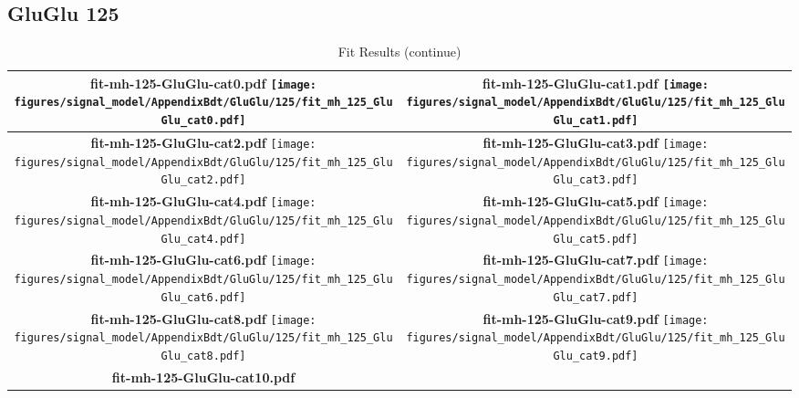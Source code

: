 \subsection{GluGlu 125}
\begin{longtable}{|c|c|}
\caption{Fit Results}
\endfirsthead
\caption{Fit Results (continue)}
\endhead
\hline
\parbox{0.47\textwidth}{
\centering
{\bfseries fit-mh-125-GluGlu-cat0.pdf}
\texttt{[image: figures/signal\_model/AppendixBdt/GluGlu/125/fit\_mh\_125\_GluGlu\_cat0.pdf]}
}
 & \parbox{0.47\textwidth}{
\centering
{\bfseries fit-mh-125-GluGlu-cat1.pdf}
\texttt{[image: figures/signal\_model/AppendixBdt/GluGlu/125/fit\_mh\_125\_GluGlu\_cat1.pdf]}
}
 \\
\hline
\parbox{0.47\textwidth}{
\centering
{\bfseries fit-mh-125-GluGlu-cat2.pdf}
\texttt{[image: figures/signal\_model/AppendixBdt/GluGlu/125/fit\_mh\_125\_GluGlu\_cat2.pdf]}
}
 & \parbox{0.47\textwidth}{
\centering
{\bfseries fit-mh-125-GluGlu-cat3.pdf}
\texttt{[image: figures/signal\_model/AppendixBdt/GluGlu/125/fit\_mh\_125\_GluGlu\_cat3.pdf]}
}
 \\
\hline
\parbox{0.47\textwidth}{
\centering
{\bfseries fit-mh-125-GluGlu-cat4.pdf}
\texttt{[image: figures/signal\_model/AppendixBdt/GluGlu/125/fit\_mh\_125\_GluGlu\_cat4.pdf]}
}
 & \parbox{0.47\textwidth}{
\centering
{\bfseries fit-mh-125-GluGlu-cat5.pdf}
\texttt{[image: figures/signal\_model/AppendixBdt/GluGlu/125/fit\_mh\_125\_GluGlu\_cat5.pdf]}
}
 \\
\hline
\parbox{0.47\textwidth}{
\centering
{\bfseries fit-mh-125-GluGlu-cat6.pdf}
\texttt{[image: figures/signal\_model/AppendixBdt/GluGlu/125/fit\_mh\_125\_GluGlu\_cat6.pdf]}
}
 & \parbox{0.47\textwidth}{
\centering
{\bfseries fit-mh-125-GluGlu-cat7.pdf}
\texttt{[image: figures/signal\_model/AppendixBdt/GluGlu/125/fit\_mh\_125\_GluGlu\_cat7.pdf]}
}
 \\
\hline
\parbox{0.47\textwidth}{
\centering
{\bfseries fit-mh-125-GluGlu-cat8.pdf}
\texttt{[image: figures/signal\_model/AppendixBdt/GluGlu/125/fit\_mh\_125\_GluGlu\_cat8.pdf]}
}
 & \parbox{0.47\textwidth}{
\centering
{\bfseries fit-mh-125-GluGlu-cat9.pdf}
\texttt{[image: figures/signal\_model/AppendixBdt/GluGlu/125/fit\_mh\_125\_GluGlu\_cat9.pdf]}
}
 \\
\hline
\parbox{0.47\textwidth}{
\centering
{\bfseries fit-mh-125-GluGlu-cat10.pdf}
}
\end{longtable}
